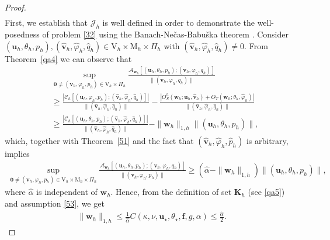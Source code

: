 \documentclass[10pt,a4paper]{article}
\begin{document}
\begin{proof}
\begin{align}
  			\end{align}
  			First, we establish that $\mathcal{J}_h$ is well defined in order to demonstrate the well-posedness of problem \eqref{32} using the Banach-Ne\v{c}as-Babu\v{s}ka theorem  \cite[Theorem 2.6] {MR2050138}.
  		     Consider $(\boldsymbol{u}_h, \theta_h, p_h),( \hat{\boldsymbol{v}}_h, \hat{\varphi}_h, \hat{q}_h) \in \mathrm{V}_h \times \mathrm{M}_h \times \Pi_h$ with $(\hat{\boldsymbol{v}}_h, \hat{\varphi}_h, \hat{q}_h) \neq 0$. From Theorem~\ref{qa4} we can observe that
  			$$
  			\begin{aligned}
  			& \sup _{\boldsymbol{0} \neq(\boldsymbol{v}_h, \varphi_h, p_h) \in \mathrm{V}_h \times \Pi_h} \frac{\mathcal{A}_{\boldsymbol{w}_h}\left[(\boldsymbol{u}_h,\theta_h, p_h);(\boldsymbol{v}_h, \varphi_h, q_h)\right]}{\|(\boldsymbol{v}_h, \varphi_h, q_h)\|} \\[3pt]
            & \geq \frac{|\mathcal{C}_h\left[(\boldsymbol{u}_h, \varphi_h, p_h);( \hat{\boldsymbol{v}}_h, \hat{\varphi}_h, \hat{q}_h)\right]|}{\|( \hat{\boldsymbol{v}}_h, \hat{\varphi}_h,\hat{q}_h)\|}-\frac{|{O}_S^h(\boldsymbol{w}_h ; \boldsymbol{u}_h, \hat{\boldsymbol{v}}_h) + O_T(\boldsymbol{w}_h; \theta_h, \hat{\varphi}_h)|}{\|(\hat{\boldsymbol{v}}_h, \hat{\varphi}_h, \hat{q}_h)\|} \\[3pt]
  			& \geq \frac{|\mathcal{C}_h\left[(\boldsymbol{u}_h, \theta_h, p_h);( \hat{\boldsymbol{v}}_h, \hat{\varphi}_h, \hat{q}_h)\right]|}{\|( \hat{\boldsymbol{v}}_h, \hat{\varphi}_h,\hat{q}_h)\|}-\|\boldsymbol{w}_h\|_{1,h}\|(\boldsymbol{u}_h, \theta_h, p_h)\| ,
  			\end{aligned}
  			$$
  			which, together with Theorem~\ref{51} and the fact that $(\hat{\boldsymbol{v}}_h, \hat{\varphi}_h, \hat{p}_h)$ is arbitrary, implies
  			\begin{align}\label{33}
  			\sup _{\boldsymbol{0} \neq (\boldsymbol{v}_h, \varphi_h, p_h) \in \mathrm{V}_h \times \mathrm{M}_h \times \Pi_h} \frac{\mathcal{A}_{\boldsymbol{w}_h}\left[(\boldsymbol{u}_h,\theta_h, p_h);(\boldsymbol{v}_h, \varphi_h, q_h)\right]}{\|(\boldsymbol{v}_h, \varphi_h, p_h)\|} \geq\left(\hat{\alpha}-\|\boldsymbol{w}_h\|_{1,h}\right)\|( \boldsymbol{u}_h, \theta_h, p_h)\|,
  			\end{align}
  		where $\hat\alpha$ is independent of $\boldsymbol{w}_h$. Hence, from the definition of set $\boldsymbol{K}_h$ (see \eqref{qa5}) and assumption \eqref{53}, we get
  			\begin{align}\label{34}
  			\|\boldsymbol{w}_h\|_{1,h} \leq \frac{1}{\hat{\alpha}} C(\kappa, \nu, \boldsymbol{u}_{\star}, \theta_{\star}, \boldsymbol{f}, g, \alpha) \leq \frac{\hat{\alpha}}{2}.

\end{align}
\end{proof}
\end{document}
